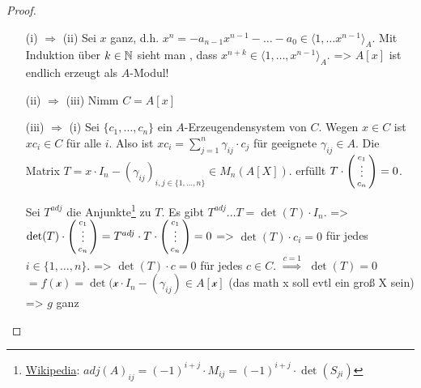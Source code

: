 \documentclass[../main.tex]{subfiles}
\begin{document}
\begin{proof}$ $
    \begin{itemize}
        \item[(i) $\Rightarrow$ (ii)]
        Sei $x$ ganz, d.h. $x^n = -a_{n-1}x^{n-1}-\dots - a_0\in \langle1,\dots x^{n-1}\rangle_A$.
        Mit Induktion über $k\in \mathbb{N}$ sieht man , dass $x^{n+k}\in \langle 1,\dots, x^{n-1}\rangle_A$.
        => $A[x]$ ist endlich erzeugt als $A$-Modul!
        \item[(ii) $\Rightarrow$ (iii)]
        Nimm $C = A[x]$
        \item[(iii) $\Rightarrow$ (i)]
        Sei $\{c_1,\dots,c_n\}$ ein $A$-Erzeugendensystem von $C$.
        Wegen $x\in C$ ist $xc_i\in C$ für alle $i$.
        Also ist $xc_i= \sum_{j=1}^n \gamma_{ij}\cdot c_j$ für geeignete $\gamma_{ij}\in A$.
        Die Matrix $T = x\cdot I_n- (\gamma_{ij})_{i,j\in \{1,\dots,n\}}\in M_n(A[X])$.
        erfüllt $T\cdot \begin{psmallmatrix}
            c_1\\
            \vphantom{\int\limits^x}\smash{\vdots}\\
            c_n
        \end{psmallmatrix} = 0$.

        Sei $T^{adj}$ die Anjunkte\footnote{\href{https://de.wikipedia.org/wiki/Adjunkte}{Wikipedia}: $adj(A)_{ij} = (-1)^{i+j} \cdot M_{ij} = (-1)^{i+j}\cdot \det(S_{ji})$} zu $T$.
        Es gibt $T^{adj}\dots T = \det(T)\cdot I_n$.
        => $\det(T)\cdot \begin{psmallmatrix}
            c_1\\
            \vphantom{\int\limits^x}\smash{\vdots}\\
            c_n
        \end{psmallmatrix} = T^{adj} \cdot T\cdot \begin{psmallmatrix}
            c_1\\
            \vphantom{\int\limits^x}\smash{\vdots}\\
            c_n
        \end{psmallmatrix} = 0$
        => $\det(T)\cdot c_i = 0$ für jedes $i\in \{1,\dots,n\}$.
        => $\det(T)\cdot c = 0$ für jedes $c\in C$.
        $\overset{c=1}{\Longrightarrow}$ $\det(T) = 0$
        $= f(\mathcal{x}) = \det(\mathcal{x}\cdot I_n - (\gamma_{ij})\in A[\mathcal{x}]$ (das math x soll evtl ein groß X sein)
        => $g$ ganz
    \end{itemize}
\end{proof}
\end{document}
